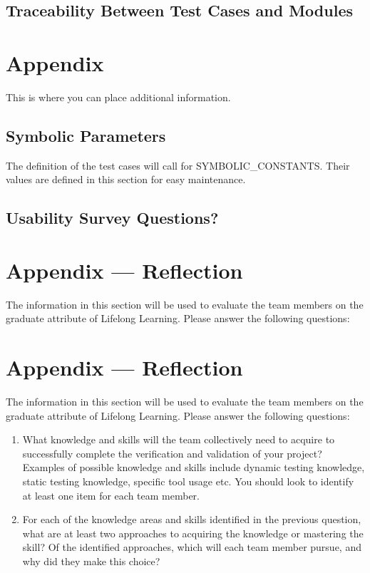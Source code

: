 \documentclass[12pt, titlepage]{article}
\begin{document}
\subsection{Traceability Between Test Cases and Modules}

				
%

%

\newpage

\section{Appendix}

This is where you can place additional information.

\subsection{Symbolic Parameters}

The definition of the test cases will call for SYMBOLIC\_CONSTANTS.
Their values are defined in this section for easy maintenance.

\subsection{Usability Survey Questions?}


\newpage{}
\section*{Appendix --- Reflection}

The information in this section will be used to evaluate the team members on the
graduate attribute of Lifelong Learning.  Please answer the following questions:

\newpage{}
\section*{Appendix --- Reflection}

The information in this section will be used to evaluate the team members on the
graduate attribute of Lifelong Learning.  Please answer the following questions:

\begin{enumerate}
  \item What knowledge and skills will the team collectively need to acquire to
  successfully complete the verification and validation of your project?
  Examples of possible knowledge and skills include dynamic testing knowledge,
  static testing knowledge, specific tool usage etc.  You should look to
  identify at least one item for each team member.
  \item For each of the knowledge areas and skills identified in the previous
  question, what are at least two approaches to acquiring the knowledge or
  mastering the skill?  Of the identified approaches, which will each team
  member pursue, and why did they make this choice?
\end{enumerate}
\end{document}
